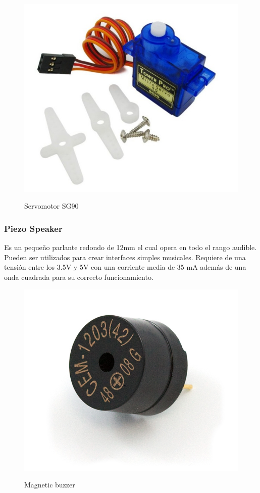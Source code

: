 \begin{figure}[H]
    \centering
    \includegraphics[width = 7 cm]{imagenes/servo.PNG}
    \caption{Servomotor SG90}
    \cite{servo}
\end{figure}

\subsubsection{Piezo Speaker}
Es un pequeño parlante redondo de 12mm el cual opera en todo el rango audible. Pueden ser utilizados para crear interfaces simples musicales. Requiere de una tensión entre los 3.5V y 5V con una corriente media de 35 mA además de una onda cuadrada para su correcto funcionamiento.

\begin{figure}[H]
    \centering
    \includegraphics[width = 7 cm]{imagenes/speaker.PNG}
    \caption{Magnetic buzzer}
    \cite{speaker}
\end{figure}


